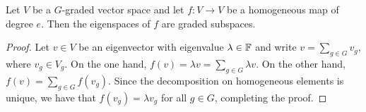 



\begin{lemma}\label{lemma:eigenvector-homogeneous}
	Let $V$ be a $G$-graded vector space and let $f: V \to V$ be a homogeneous map of degree $e$. Then the eigenspaces of $f$ are graded subspaces.
\end{lemma}

\begin{proof}
	Let $v\in V$ be an eigenvector with eigenvalue $\lambda \in \mathbb{F}$ and write $v = \sum_{g\in G} v_g$, where $v_g \in V_g$. 
	On the one hand, $f(v) = \lambda v = \sum_{g\in G} \lambda v$. 
	On the other hand, $f(v) = \sum_{g\in G} f(v_g)$. 
	Since the decomposition on homogeneous elements is unique, we have that $f(v_g) = \lambda v_g$ for all $g\in G$, completing the proof.
\end{proof}
